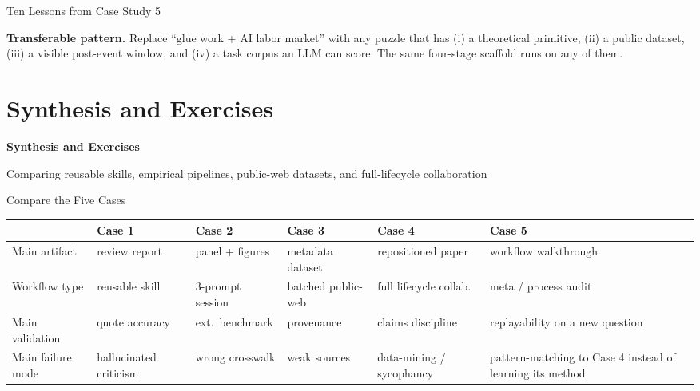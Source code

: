 \documentclass[10pt,english,aspectratio=169]{beamer}
\newcommand{\sectiondivider}[2]{%
\begin{frame}[plain,noframenumbering]
\begin{center}
\vfill
{\Large\textbf{#1}\par}
\vspace{0.35cm}
{\normalsize #2\par}
\vfill
\end{center}
\end{frame}
}
\begin{document}
\begin{frame}{Ten Lessons from Case Study 5}
\vspace{0.15cm}
\begin{tcolorbox}[colback=blue!3,colframe=RedTitle!60]\scriptsize
\textbf{Transferable pattern.} Replace ``glue work + AI labor market'' with any puzzle that has (i) a theoretical primitive, (ii) a public dataset, (iii) a visible post-event window, and (iv) a task corpus an LLM can score. The same four-stage scaffold runs on any of them.
\end{tcolorbox}
\end{frame}

\section{Synthesis and Exercises}

\sectiondivider{Synthesis and Exercises}{Comparing reusable skills, empirical pipelines, public-web datasets, and full-lifecycle collaboration}

\begin{frame}{Compare the Five Cases}
\scriptsize
\begin{tabular}{p{2.2cm}p{1.7cm}p{1.9cm}p{1.9cm}p{2.1cm}p{2.2cm}}
\toprule
 & \textbf{Case 1} & \textbf{Case 2} & \textbf{Case 3} & \textbf{Case 4} & \textbf{Case 5} \\
\midrule
Main artifact & review report & panel + figures & metadata dataset & repositioned paper & workflow walkthrough \\
Workflow type & reusable skill & 3-prompt session & batched public-web & full lifecycle collab. & meta / process audit \\
Main validation & quote accuracy & ext.\ benchmark & provenance & claims discipline & replayability on a new question \\
Main failure mode & hallucinated criticism & wrong crosswalk & weak sources & data-mining / sycophancy & pattern-matching to Case 4 instead of learning its method \\
\bottomrule
\end{tabular}
\end{frame}
\end{document}

